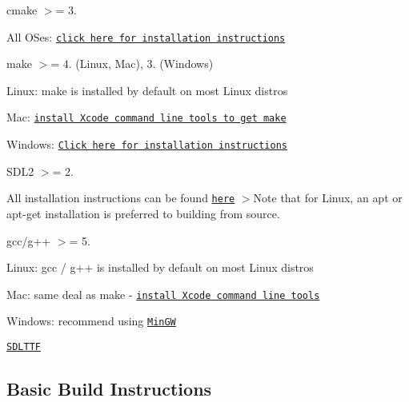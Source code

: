 \begin{DoxyItemize}
\item cmake $>$= 3.
\begin{DoxyItemize}
\item All O\+Ses\+: \href{https://cmake.org/install/}{\tt click here for installation instructions}
\end{DoxyItemize}
\item make $>$= 4. (Linux, Mac), 3. (Windows)
\begin{DoxyItemize}
\item Linux\+: make is installed by default on most Linux distros
\item Mac\+: \href{https://developer.apple.com/xcode/features/}{\tt install Xcode command line tools to get make}
\item Windows\+: \href{http://gnuwin32.sourceforge.net/packages/make.htm}{\tt Click here for installation instructions}
\end{DoxyItemize}
\item S\+D\+L2 $>$= 2.
\begin{DoxyItemize}
\item All installation instructions can be found \href{https://wiki.libsdl.org/Installation}{\tt here} $>$Note that for Linux, an {\ttfamily apt} or {\ttfamily apt-\/get} installation is preferred to building from source.
\end{DoxyItemize}
\item gcc/g++ $>$= 5.
\begin{DoxyItemize}
\item Linux\+: gcc / g++ is installed by default on most Linux distros
\item Mac\+: same deal as make -\/ \href{https://developer.apple.com/xcode/features/}{\tt install Xcode command line tools}
\item Windows\+: recommend using \href{http://www.mingw.org/}{\tt Min\+GW}
\end{DoxyItemize}
\item \href{https://github.com/libsdl-org/SDL_ttf}{\tt S\+D\+L\+T\+TF}
\begin{DoxyItemize}
\item \subsection*{Basic Build Instructions}
\end{DoxyItemize}
\end{DoxyItemize}
